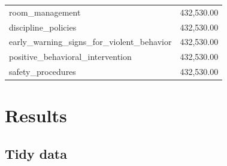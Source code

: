 \documentclass[man]{apa6}
\begin{document}
\begin{table}[tbp]
\begin{center}
\begin{threeparttable}
\begin{tabular}{ll}
room\_management & 432,530.00\\
discipline\_policies & 432,530.00\\
early\_warning\_signs\_for\_violent\_behavior & 432,530.00\\
positive\_behavioral\_intervention & 432,530.00\\
safety\_procedures & 432,530.00\\
\bottomrule
\end{tabular}

\end{threeparttable}
\end{center}

\end{table}

\hypertarget{results}{%
\section{Results}\label{results}}

\hypertarget{tidy-data-1}{%
\subsection{Tidy data}\label{tidy-data-1}}
\end{document}
